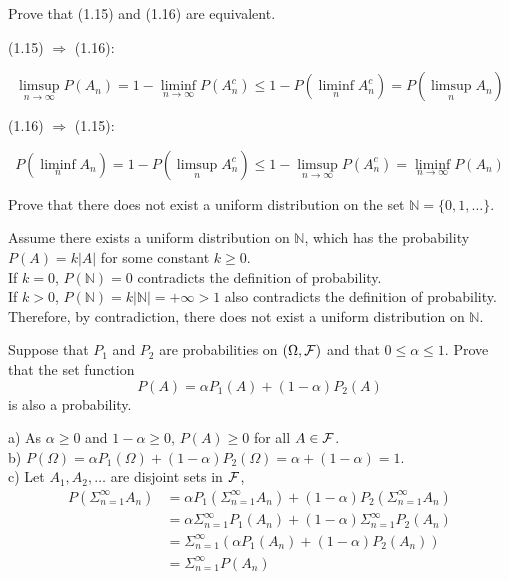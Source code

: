 \begin{exercise}
  Prove that (1.15) and (1.16) are equivalent.
\end{exercise}
\begin{solution}
  (1.15) $\Rightarrow$ (1.16):

  \[ \limsup_{n\to\infty}P(A_n) = 1 - \liminf_{n\to\infty}P(A_n^c) \leq 1 - P(\liminf_n A_n^c) = P(\limsup_n A_n) \]

  (1.16) $\Rightarrow$ (1.15):

  \[ P(\liminf_n A_n) = 1 - P(\limsup_n A_n^c) \leq 1 - \limsup_{n\to\infty}P(A_n^c) = \liminf_{n\to\infty}P(A_n) \]
\end{solution}

\begin{exercise}
  Prove that there does not exist a uniform distribution on the set $\mathbb{N}=\{ 0, 1, \ldots \}$.
\end{exercise}
\begin{solution}
  Assume there exists a uniform distribution on $\mathbb{N}$, which has the probability $P(A) = k|A|$ for some constant $k \geq 0$. \\
  If $k=0$, $P(\mathbb{N})=0$ contradicts the definition of probability. \\
  If $k>0$, $P(\mathbb{N}) = k|\mathbb{N}| = +\infty > 1$ also contradicts the definition of probability. \\
  Therefore, by contradiction, there does not exist a uniform distribution on $\mathbb{N}$.
\end{solution}

\begin{exercise}
  Suppose that $P_1$ and $P_2$ are probabilities on $(\Omega, \cal F)$ and that $0\leq \alpha\leq 1$. Prove that the set function
  \[ P(A) = \alpha P_1(A) + (1-\alpha)P_2(A) \]
  is also a probability.
\end{exercise}
\begin{solution}
a) As $\alpha\geq 0$ and $1-\alpha\geq 0$, $P(A)\geq 0$ for all $A\in\cal F$. \\
b) $P(\Omega) = \alpha P_1(\Omega) + (1-\alpha) P_2(\Omega) = \alpha + (1-\alpha) = 1$. \\
c) Let $A_1, A_2,\ldots$ are disjoint sets in $\cal F$,
\begin{align*}
P(\Sigma_{n=1}^\infty A_n) &= \alpha P_1(\Sigma_{n=1}^\infty A_n) + (1-\alpha) P_2(\Sigma_{n=1}^\infty A_n) \\
  &= \alpha \Sigma_{n=1}^\infty P_1(A_n) + (1-\alpha) \Sigma_{n=1}^\infty P_2(A_n) \\
  &= \Sigma_{n=1}^\infty (\alpha P_1(A_n) + (1-\alpha)P_2(A_n)) \\
  &= \Sigma_{n=1}^\infty P(A_n)
\end{align*}
\end{solution}

